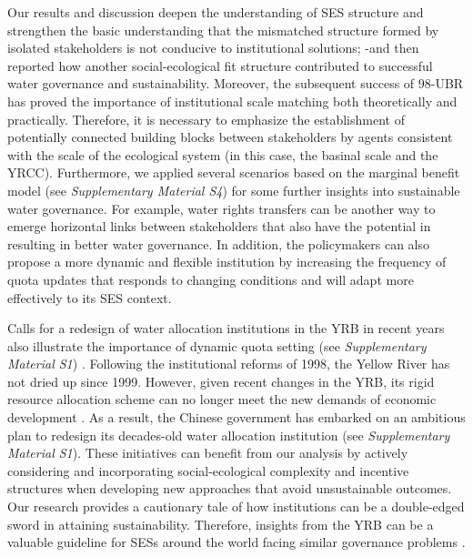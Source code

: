 Our results and discussion deepen the understanding of SES structure and strengthen the basic understanding that the mismatched structure formed by isolated stakeholders is not conducive to institutional solutions; -and then reported how another social-ecological fit structure contributed to successful water governance and sustainability.
Moreover, the subsequent success of 98-UBR has proved the importance of institutional scale matching both theoretically and practically. Therefore, it is necessary to emphasize the establishment of potentially connected building blocks between stakeholders by agents consistent with the scale of the ecological system (in this case, the basinal scale and the YRCC).
Furthermore, we applied several scenarios based on the marginal benefit model (see \textit{Supplementary Material S4}) for some further insights into sustainable water governance.
For example, water rights transfers can be another way to emerge horizontal links between stakeholders that also have the potential in resulting in better water governance.
In addition, the policymakers can also propose a more dynamic and flexible institution by increasing the frequency of quota updates that responds to changing conditions and will adapt more effectively to its SES context.

Calls for a redesign of water allocation institutions in the YRB in recent years also illustrate the importance of dynamic quota setting (see \textit{Supplementary Material S1}) \cite{yu2019}. Following the institutional reforms of 1998, the Yellow River has not dried up since 1999. However, given recent changes in the YRB, its rigid resource allocation scheme can no longer meet the new demands of economic development \cite{wang2019a}. As a result, the Chinese government has embarked on an ambitious plan to redesign its decades-old water allocation institution (see \textit{Supplementary Material S1}). These initiatives can benefit from our analysis by actively considering and incorporating social-ecological complexity and incentive structures when developing new approaches that avoid unsustainable outcomes. Our research provides a cautionary tale of how institutions can be a double-edged sword in attaining sustainability. Therefore, insights from the YRB can be a valuable guideline for SESs around the world facing similar governance problems \cite{cumming2020b, muneepeerakul2017, cumming2020a, leslie2015}.
